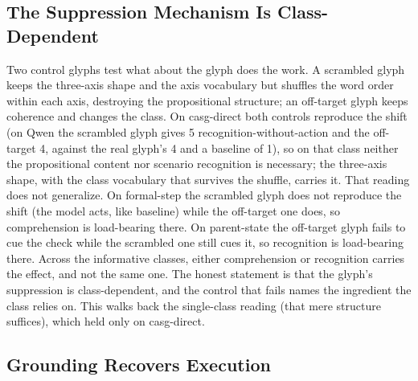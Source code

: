 \documentclass[11pt,a4paper]{article}
\begin{document}
\subsection{The Suppression Mechanism Is Class-Dependent}\label{sec:mechanism}

Two control glyphs test what about the glyph does the work. A scrambled glyph keeps
the three-axis shape and the axis vocabulary but shuffles the word order within each
axis, destroying the propositional structure; an off-target glyph keeps coherence
and changes the class. On casg-direct both controls reproduce the shift (on Qwen the
scrambled glyph gives 5 recognition-without-action and the off-target 4, against the
real glyph's 4 and a baseline of 1), so on that class neither the propositional content
nor scenario recognition is necessary; the three-axis shape, with the class vocabulary
that survives the shuffle, carries it. That
reading does not generalize. On formal-step the scrambled glyph does not reproduce
the shift (the model acts, like baseline) while the off-target one does, so
comprehension is load-bearing there. On parent-state the off-target glyph fails to
cue the check while the scrambled one still cues it, so recognition is load-bearing
there. Across the informative classes, either comprehension or recognition carries
the effect, and not the same one. The honest statement is that the glyph's
suppression is class-dependent, and the control that fails names the ingredient the
class relies on. This walks back the single-class reading (that mere structure
suffices), which held only on casg-direct.

\subsection{Grounding Recovers Execution}\label{sec:ground}
\end{document}
